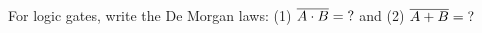 

\vspace*{\fill}
\centering

For logic gates, write the De Morgan laws: (1) $\overline{A \cdot B} = {\rm ?}$ and (2) $\overline{A + B} = {\rm ?}$

\centering
\vspace*{\fill}

